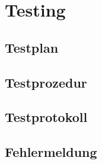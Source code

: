\chapter{Testing}
\section{Testplan}
\section{Testprozedur}
\section{Testprotokoll}
\section{Fehlermeldung}
